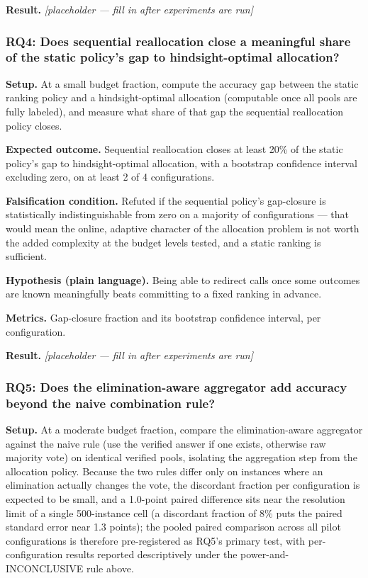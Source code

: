 \documentclass[11pt]{article}
\newcommand{\ph}{\textit{[placeholder --- fill in after experiments are run]}}
\begin{document}
\textbf{Result.} \ph

\subsubsection{RQ4: Does sequential reallocation close a meaningful share of the static policy's gap to hindsight-optimal allocation?}
\textbf{Setup.} At a small budget fraction, compute the accuracy gap between the static ranking policy and a hindsight-optimal allocation (computable once all pools are fully labeled), and measure what share of that gap the sequential reallocation policy closes.

\textbf{Expected outcome.} Sequential reallocation closes at least 20\% of the static policy's gap to hindsight-optimal allocation, with a bootstrap confidence interval excluding zero, on at least 2 of 4 configurations.

\textbf{Falsification condition.} Refuted if the sequential policy's gap-closure is statistically indistinguishable from zero on a majority of configurations --- that would mean the online, adaptive character of the allocation problem is not worth the added complexity at the budget levels tested, and a static ranking is sufficient.

\textbf{Hypothesis (plain language).} Being able to redirect calls once some outcomes are known meaningfully beats committing to a fixed ranking in advance.

\textbf{Metrics.} Gap-closure fraction and its bootstrap confidence interval, per configuration.

\textbf{Result.} \ph

\subsubsection{RQ5: Does the elimination-aware aggregator add accuracy beyond the naive combination rule?}
\textbf{Setup.} At a moderate budget fraction, compare the elimination-aware aggregator against the naive rule (use the verified answer if one exists, otherwise raw majority vote) on identical verified pools, isolating the aggregation step from the allocation policy. Because the two rules differ only on instances where an elimination actually changes the vote, the discordant fraction per configuration is expected to be small, and a 1.0-point paired difference sits near the resolution limit of a single 500-instance cell (a discordant fraction of 8\% puts the paired standard error near 1.3 points); the pooled paired comparison across all pilot configurations is therefore pre-registered as RQ5's primary test, with per-configuration results reported descriptively under the power-and-INCONCLUSIVE rule above.
\end{document}
